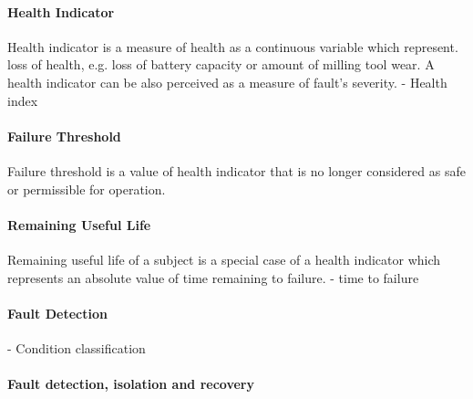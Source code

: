 \paragraph{Health Indicator}
Health indicator is a measure of health as a continuous variable which represent.
loss of health, e.g. loss of battery capacity or amount of milling tool wear.
A health indicator can be also perceived as a measure of fault's severity.
 - Health index

\paragraph{Failure Threshold}
Failure threshold is a value of health indicator that is no longer considered as safe
or permissible for operation.

\paragraph{Remaining Useful Life}
Remaining useful life of a subject is a special case of a health indicator which represents an absolute value of time remaining to failure.
 - time to failure

\paragraph{Fault Detection}
 - Condition classification
 
\paragraph{Fault detection, isolation and recovery}